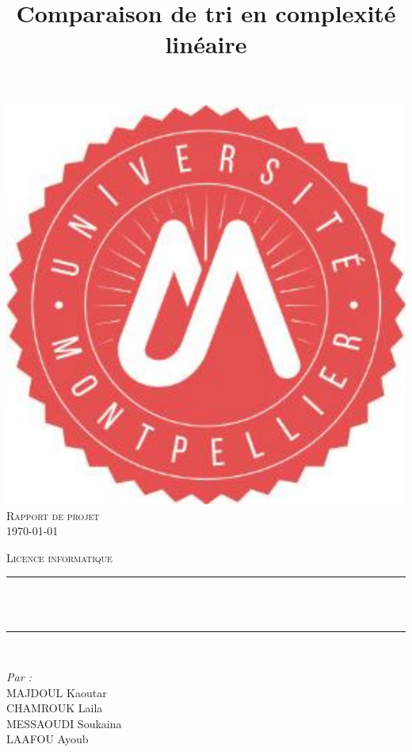 \documentclass[12pt]{article}
\title{Comparaison de tri en complexité linéaire}								%
\makeatletter
\let\thetitle\@title
\makeatother
\begin{document}

\begin{titlepage}
	\centering
    \vspace*{0.1 cm}
    \includegraphics[scale = 1.2]{logo.png}\\[3.0 cm]	%
    \textsc{\LARGE  Rapport de projet }\\[1.0 cm]	%
 


\ddmmyyyydate \today

    
    
	\textsc{\Large Licence informatique }\\[0.5 cm]				%
	\rule{\linewidth}{0.2 mm} \\[0.4 cm]
	{ \huge \bfseries \thetitle}\\
	\rule{\linewidth}{0.2 mm} \\[1.5 cm]
	
	\begin{minipage}{0.4\textwidth}
		\begin{flushleft} \large
			\emph{Par :}\\
			MAJDOUL  Kaoutar\\
            CHAMROUK Laila\\
            MESSAOUDI Soukaina\\
            LAAFOU Ayoub\\
			\end{flushleft}
			\end{minipage}~
			\begin{minipage}{0.4\textwidth}
            

\end{minipage}
\end{titlepage}
\end{document}
